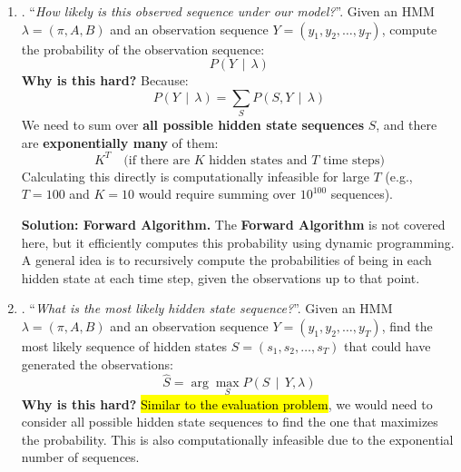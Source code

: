\begin{enumerate}
    \item {}. ``\emph{How likely is this observed sequence under our model?}''. Given an HMM $\lambda = (\pi, A, B)$ and an observation sequence $Y = (y_1, y_2, \ldots, y_T)$, compute the probability of the observation sequence:
    \begin{equation*}
        P\left(Y \, \mid \, \lambda\right)
    \end{equation*}
    \textcolor{Red2}{ \textbf{Why is this hard?}} Because:
    \begin{equation*}
        P\left(Y \, \mid \, \lambda\right) = \sum_{S} P\left(S, Y \, \mid \, \lambda\right)
    \end{equation*}
    We need to sum over \textbf{all possible hidden state sequences} $S$, and there are \textbf{exponentially many} of them:
    \begin{equation*}
        K^{T} \quad \text{(if there are $K$ hidden states and $T$ time steps)}
    \end{equation*}
    Calculating this directly is computationally infeasible for large $T$ (e.g., $T=100$ and $K=10$ would require summing over $10^{100}$ sequences).

    \textcolor{Green3}{ \textbf{Solution: Forward Algorithm.}} The \textbf{Forward Algorithm} is not covered here, but it efficiently computes this probability using dynamic programming. A general idea is to recursively compute the probabilities of being in each hidden state at each time step, given the observations up to that point.


    \item {}. ``\emph{What is the most likely hidden state sequence?}''. Given an HMM $\lambda = (\pi, A, B)$ and an observation sequence $Y = (y_1, y_2, \ldots, y_T)$, find the most likely sequence of hidden states $S = (s_1, s_2, \ldots, s_T)$ that could have generated the observations:
    \begin{equation*}
        \hat{S} = \arg\max_{S} P\left(S \, \mid \, Y, \lambda\right)
    \end{equation*}
    \textcolor{Red2}{ \textbf{Why is this hard?}} \hl{Similar to the evaluation problem}, we would need to consider all possible hidden state sequences to find the one that maximizes the probability. This is also computationally infeasible due to the exponential number of sequences.


\end{enumerate}
